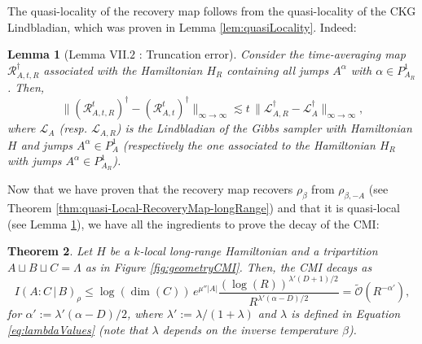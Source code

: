 \documentclass[11pt]{article}
\numberwithin{equation}{section}
\numberwithin{figure}{section}
\numberwithin{table}{section}
\theoremstyle{definition}
\theoremstyle{plain}
\newtheorem{thm}{Theorem}[section]
\newtheorem{lem}[thm]{Lemma}
\theoremstyle{remark}
\newcommand{\p}{\rho}
\newcommand{\La}{\Lambda}
\newcommand{\abs}[1]{\left \vert#1\right\vert}
\begin{document}

The quasi-locality of the recovery map follows from the quasi-locality of the CKG Lindbladian, which was proven in Lemma \ref{lem:quasiLocality}. Indeed:
\medskip
\begin{lem}[Lemma VII.$2$ \cite{chen_quantum_2025}: Truncation error]\label{lem:truncationError}
Consider the time-averaging map $\mathcal{R}^{\dagger}_{A,t,R}$ associated with the Hamiltonian 
$H_R$ containing all jumps $A^{\alpha}$ with $\alpha \in P_{A_R}^1$. Then,
\begin{equation}
    \bigl\| (\mathcal{R}^t_{A,t,R} )^\dagger-  (\mathcal{R}^t_{A,t})^\dagger \bigr\|_{\infty \to \infty}
    \lesssim
    t \, \bigl\| \mathcal{L}^{\dagger}_{A,R} - \mathcal{L}^{\dagger}_{A} \bigr\|_{\infty \to \infty},
\end{equation}
where $\mathcal{L}_A$ (resp. $\mathcal{L}_{A,R}$) is the Lindbladian of the Gibbs sampler 
with Hamiltonian $H$ and jumps $A^{\alpha} \in P_A^1$ (respectively the one associated to the 
Hamiltonian $H_R$ with jumps $A^{\alpha} \in P_{A_R}^1$).
\end{lem}

Now that we have proven that the recovery map recovers $\rho_\beta$ from $\p_{\beta,-A}$ (see Theorem \ref{thm:quasi-Local-RecoveryMap-longRange}) and that it is quasi-local (see Lemma \ref{lem:truncationError}), we have all the ingredients to prove the decay of the CMI:
\medskip
\begin{thm}\label{thm:cmiCKGLindbladian}
    Let $H$ be a $k$-local long-range Hamiltonian and a tripartition $A\sqcup B\sqcup C=\La$ as in Figure \ref{fig:geometryCMI}. Then,
    the CMI decays as
    \begin{equation}
        I(A : C \,|\, B)_\rho \le \log(\dim(C)) \,e^{\mu ''\abs{A}} \dfrac{(\log (R))^{\lambda'(D+1)/2}}{R^{\lambda ' (\alpha-D)/2}} =\tilde{\mathcal{O}}(R^{-\alpha'}),
    \end{equation}
    for $\alpha':=\lambda ' (\alpha-D)/2$, where $\lambda':=\lambda/(1+\lambda)$ and $\lambda$ is defined in Equation \eqref{eq:lambdaValues} (note that $\lambda$ depends on the inverse temperature $\beta$).
\end{thm}
\end{document}
